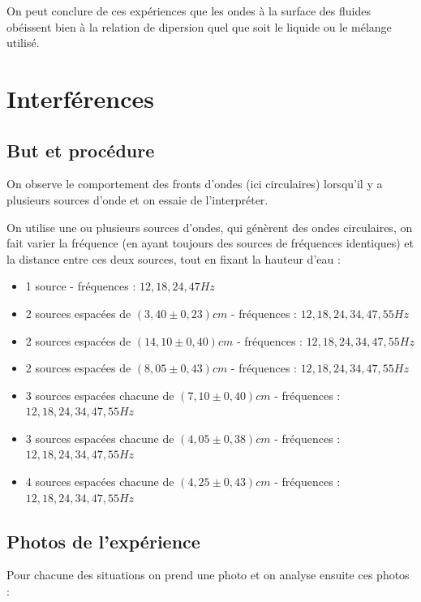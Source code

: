 \documentclass{report}
\begin{document}
On peut conclure de ces expériences que les ondes à la surface des fluides obéissent bien à la relation de dipersion quel que soit le liquide ou le mélange utilisé.

\section{Interférences}


\subsection{But et procédure}
On observe le comportement des fronts d'ondes (ici circulaires) lorsqu'il y a plusieurs sources d'onde et on essaie de l'interpréter.

On utilise une ou plusieurs sources d'ondes, qui génèrent des ondes circulaires, on fait varier la fréquence (en ayant toujours des sources de fréquences identiques) et la distance entre ces deux sources, tout en fixant la hauteur d'eau : 

\begin{itemize}[label=]
    \item 1 source - fréquences : $12, 18, 24, 47 Hz$
    \item 2 sources espacées de $(3,40 \pm 0,23) cm$ - fréquences : $12, 18, 24, 34, 47, 55 Hz$
    \item 2 sources espacées de $(14,10 \pm 0,40) cm$ - fréquences : $12, 18, 24, 34, 47, 55 Hz$
    \item 2 sources espacées de $(8,05 \pm 0,43) cm$ - fréquences : $12, 18, 24, 34, 47, 55 Hz$
    \item 3 sources espacées chacune de $(7,10 \pm 0,40) cm$ - fréquences : $12, 18, 24, 34, 47, 55 Hz$
    \item 3 sources espacées chacune de $(4,05 \pm 0,38) cm$ - fréquences : $12, 18, 24, 34, 47, 55 Hz$
    \item 4 sources espacées chacune de $(4,25 \pm 0,43) cm$ - fréquences : $12, 18, 24, 34, 47, 55 Hz$
\end{itemize}

\subsection{Photos de l'expérience}

Pour chacune des situations on prend une photo et on analyse ensuite ces photos :
\end{document}
